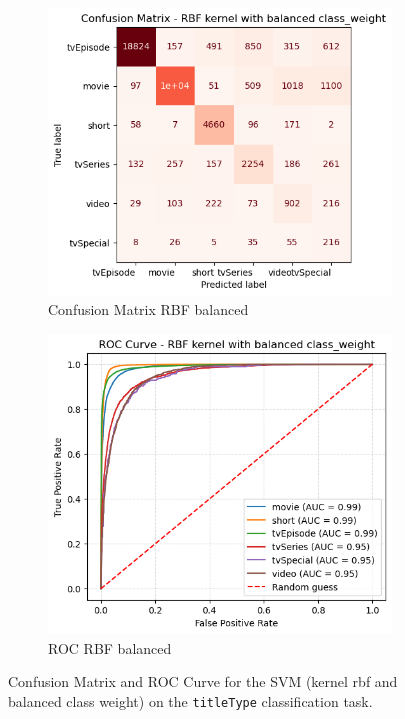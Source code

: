 \begin{figure}[h]
    \centering
    \begin{subfigure}[b]{0.47\textwidth}
        \centering
        \includegraphics[width=\textwidth]{plotsss/new_cm_rbf_balanced.png}
        \caption{Confusion Matrix RBF balanced}
        \label{fig:cm_rbf_balanced}
    \end{subfigure}
    \begin{subfigure}[b]{0.43\textwidth}
        \centering
        \includegraphics[width=\textwidth]{plotsss/new_roc_rbf_balanced.png}
        \caption{ROC RBF balanced}
        \label{fig:roc_rbf_balanced}
    \end{subfigure}
    \caption{Confusion Matrix and ROC Curve for the SVM (kernel rbf and balanced class weight) on the \texttt{titleType} classification task.}  
    \label{fig:rbf_balanced_two}
\end{figure}


